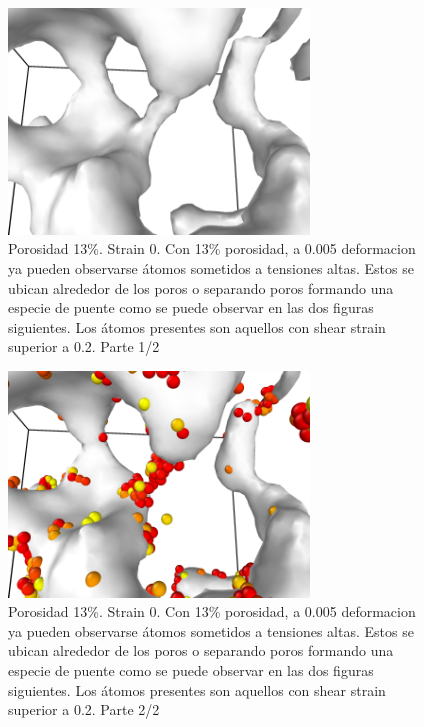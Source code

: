 \documentclass[10pt, oneside]{article} %
\begin{document}
\begin{figure}[H]
\centering
\includegraphics[width=8cm]{Figures/porosidad_13_0_puente.png}
\caption{Porosidad 13\%. Strain 0. Con 13\% porosidad, a 0.005 deformacion ya pueden observarse átomos sometidos a tensiones altas. Estos se ubican alrededor de los poros o separando poros formando una especie de puente como se puede observar en las dos figuras siguientes. Los átomos presentes son aquellos con shear strain superior a 0.2. Parte 1/2}
\end{figure}

\begin{figure}[H]
\centering
\includegraphics[width=8cm]{Figures/porosidad_13_0005_puente.png}
\caption{Porosidad 13\%. Strain 0. Con 13\% porosidad, a 0.005 deformacion ya pueden observarse átomos sometidos a tensiones altas. Estos se ubican alrededor de los poros o separando poros formando una especie de puente como se puede observar en las dos figuras siguientes. Los átomos presentes son aquellos con shear strain superior a 0.2. Parte 2/2}
\end{figure}
\end{document}

